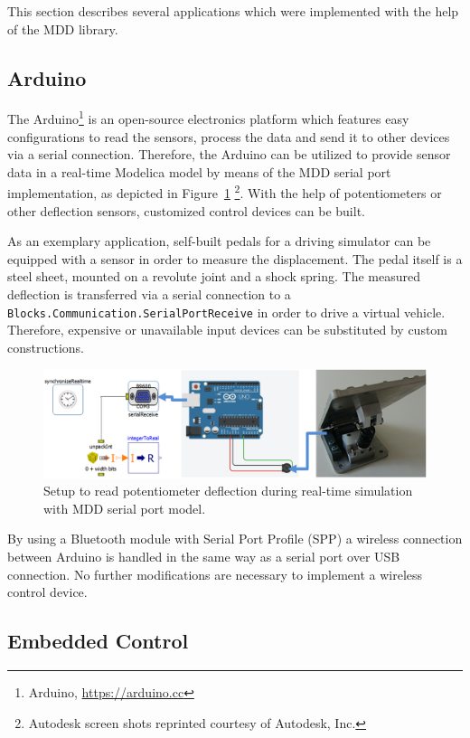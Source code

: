 \documentclass{resources/modelica}
\newcommand{\modelica}[1]{\lstinline[language=modelica]|#1|}
\begin{document}
This section describes several applications which were implemented with the
help of the MDD library.

\subsection{Arduino}

The Arduino\footnote{Arduino, \url{https://arduino.cc}} is an open-source electronics platform which features easy configurations to read the sensors, process the data and send it to other devices via a serial connection.
Therefore, the Arduino can be utilized to provide sensor data in a real-time Modelica model by means of the MDD serial port implementation, as depicted in Figure~\ref{fig:arduino} \footnote{Autodesk screen shots reprinted courtesy of Autodesk, Inc.}.
With the help of potentiometers or other deflection sensors, customized control devices can be built.

As an exemplary application, self-built pedals for a driving simulator can be equipped with a sensor in order to measure the displacement. The pedal itself is a steel sheet, mounted on a revolute joint and a shock spring.
The measured deflection is transferred via a serial connection to a \modelica{Blocks.Communication.SerialPortReceive} in order to drive a virtual vehicle.
Therefore, expensive or unavailable input devices can be substituted by custom constructions.
\begin{figure}[htb]
  \centering
  \includegraphics[width=0.9\columnwidth]{figures/arduino}
  \caption{Setup to read potentiometer deflection during real-time simulation with MDD serial port model.}
  \label{fig:arduino}
\end{figure}

\noindent
By using a Bluetooth module with Serial Port Profile (SPP) a wireless connection between Arduino is handled in the same way as a serial port over USB connection.
No further modifications are necessary to implement a wireless control device.

\subsection{Embedded Control}
\label{sec:EmbeddedControl}
\end{document}
